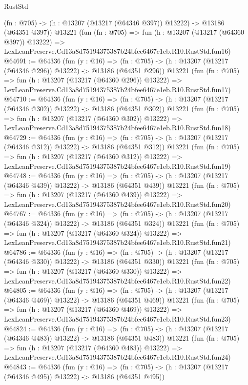 \begin{lexlean}{RustStd}
\begin{coremodule}
    (fn : @705) -> (h : @13207 (@13217 (@64346 @397)) @13222) -> @13186 (@64351 @397))
    @13221
    (fun (fn : @705) =>
    fun (h : @13207 (@13217 (@64360 @397)) @13222) =>
    LexLeanPreserve.Cd13a8d75194375387b24bfee6467e1eb.R10.RustStd.fun16)
@64691 := @64336
    (fun (y : @16) =>
    (fn : @705) -> (h : @13207 (@13217 (@64346 @296)) @13222) -> @13186 (@64351 @296))
    @13221
    (fun (fn : @705) =>
    fun (h : @13207 (@13217 (@64360 @296)) @13222) =>
    LexLeanPreserve.Cd13a8d75194375387b24bfee6467e1eb.R10.RustStd.fun17)
@64710 := @64336
    (fun (y : @16) =>
    (fn : @705) -> (h : @13207 (@13217 (@64346 @302)) @13222) -> @13186 (@64351 @302))
    @13221
    (fun (fn : @705) =>
    fun (h : @13207 (@13217 (@64360 @302)) @13222) =>
    LexLeanPreserve.Cd13a8d75194375387b24bfee6467e1eb.R10.RustStd.fun18)
@64729 := @64336
    (fun (y : @16) =>
    (fn : @705) -> (h : @13207 (@13217 (@64346 @312)) @13222) -> @13186 (@64351 @312))
    @13221
    (fun (fn : @705) =>
    fun (h : @13207 (@13217 (@64360 @312)) @13222) =>
    LexLeanPreserve.Cd13a8d75194375387b24bfee6467e1eb.R10.RustStd.fun19)
@64748 := @64336
    (fun (y : @16) =>
    (fn : @705) -> (h : @13207 (@13217 (@64346 @439)) @13222) -> @13186 (@64351 @439))
    @13221
    (fun (fn : @705) =>
    fun (h : @13207 (@13217 (@64360 @439)) @13222) =>
    LexLeanPreserve.Cd13a8d75194375387b24bfee6467e1eb.R10.RustStd.fun20)
@64767 := @64336
    (fun (y : @16) =>
    (fn : @705) -> (h : @13207 (@13217 (@64346 @324)) @13222) -> @13186 (@64351 @324))
    @13221
    (fun (fn : @705) =>
    fun (h : @13207 (@13217 (@64360 @324)) @13222) =>
    LexLeanPreserve.Cd13a8d75194375387b24bfee6467e1eb.R10.RustStd.fun21)
@64786 := @64336
    (fun (y : @16) =>
    (fn : @705) -> (h : @13207 (@13217 (@64346 @330)) @13222) -> @13186 (@64351 @330))
    @13221
    (fun (fn : @705) =>
    fun (h : @13207 (@13217 (@64360 @330)) @13222) =>
    LexLeanPreserve.Cd13a8d75194375387b24bfee6467e1eb.R10.RustStd.fun22)
@64805 := @64336
    (fun (y : @16) =>
    (fn : @705) -> (h : @13207 (@13217 (@64346 @469)) @13222) -> @13186 (@64351 @469))
    @13221
    (fun (fn : @705) =>
    fun (h : @13207 (@13217 (@64360 @469)) @13222) =>
    LexLeanPreserve.Cd13a8d75194375387b24bfee6467e1eb.R10.RustStd.fun23)
@64824 := @64336
    (fun (y : @16) =>
    (fn : @705) -> (h : @13207 (@13217 (@64346 @483)) @13222) -> @13186 (@64351 @483))
    @13221
    (fun (fn : @705) =>
    fun (h : @13207 (@13217 (@64360 @483)) @13222) =>
    LexLeanPreserve.Cd13a8d75194375387b24bfee6467e1eb.R10.RustStd.fun24)
@64843 := @64336
    (fun (y : @16) =>
    (fn : @705) -> (h : @13207 (@13217 (@64346 @495)) @13222) -> @13186 (@64351 @495))

\end{coremodule}
\end{lexlean}
